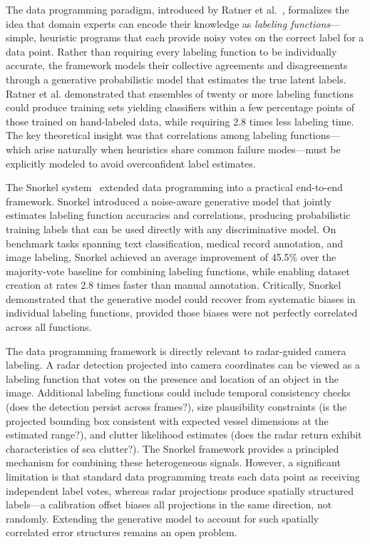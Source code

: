 The data programming paradigm, introduced by Ratner et al.~\cite{ratner2016data}, formalizes the idea that domain experts can encode their knowledge as \emph{labeling functions}---simple, heuristic programs that each provide noisy votes on the correct label for a data point. Rather than requiring every labeling function to be individually accurate, the framework models their collective agreements and disagreements through a generative probabilistic model that estimates the true latent labels. Ratner et al. demonstrated that ensembles of twenty or more labeling functions could produce training sets yielding classifiers within a few percentage points of those trained on hand-labeled data, while requiring 2.8 times less labeling time. The key theoretical insight was that correlations among labeling functions---which arise naturally when heuristics share common failure modes---must be explicitly modeled to avoid overconfident label estimates.

The Snorkel system~\cite{ratner2017snorkel} extended data programming into a practical end-to-end framework. Snorkel introduced a noise-aware generative model that jointly estimates labeling function accuracies and correlations, producing probabilistic training labels that can be used directly with any discriminative model. On benchmark tasks spanning text classification, medical record annotation, and image labeling, Snorkel achieved an average improvement of 45.5\% over the majority-vote baseline for combining labeling functions, while enabling dataset creation at rates 2.8 times faster than manual annotation. Critically, Snorkel demonstrated that the generative model could recover from systematic biases in individual labeling functions, provided those biases were not perfectly correlated across all functions.

The data programming framework is directly relevant to radar-guided camera labeling. A radar detection projected into camera coordinates can be viewed as a labeling function that votes on the presence and location of an object in the image. Additional labeling functions could include temporal consistency checks (does the detection persist across frames?), size plausibility constraints (is the projected bounding box consistent with expected vessel dimensions at the estimated range?), and clutter likelihood estimates (does the radar return exhibit characteristics of sea clutter?). The Snorkel framework provides a principled mechanism for combining these heterogeneous signals. However, a significant limitation is that standard data programming treats each data point as receiving independent label votes, whereas radar projections produce spatially structured labels---a calibration offset biases all projections in the same direction, not randomly. Extending the generative model to account for such spatially correlated error structures remains an open problem.

